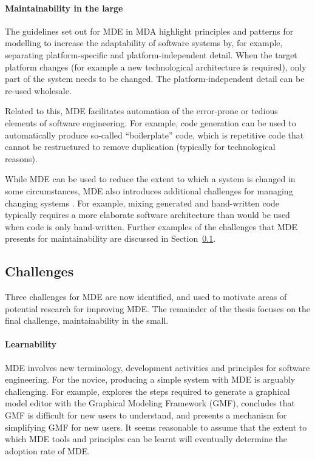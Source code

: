 \paragraph{Maintainability in the large} The guidelines set out for MDE in MDA \cite{mda} highlight principles and patterns for modelling to increase the adaptability of software systems by, for example, separating platform-specific and platform-independent detail. When the target platform changes (for example a new technological architecture is required), only part of the system needs to be changed. The platform-independent detail can be re-used wholesale. 

Related to this, MDE facilitates automation of the error-prone or tedious elements of software engineering. For example, code generation can be used to automatically produce so-called ``boilerplate'' code, which is repetitive code that cannot be restructured to remove duplication (typically for technological reasons).

While MDE can be used to reduce the extent to which a system is changed in some circumstances, MDE also introduces additional challenges for managing changing systems \cite{Mens07}. For example, mixing generated and hand-written code typically requires a more elaborate software architecture than would be used when code is only hand-written. Further examples of the challenges that MDE presents for maintainability are discussed in Section~\ref{subsec:mde_challenges}.


\subsection{Challenges}
\label{subsec:mde_challenges}
Three challenges for MDE are now identified, and used to motivate areas of potential research for improving MDE. The remainder of the thesis focuses on the final challenge, maintainability in the small.

\paragraph{Learnability} MDE involves new terminology, development activities and principles for software engineering. For the novice, producing a simple system with MDE is arguably challenging. For example, \cite{kolovos09eugenia} explores the steps required to generate a graphical model editor with the Graphical Modeling Framework (GMF), concludes that GMF is difficult for new users to understand, and presents a mechanism for simplifying GMF for new users. It seems reasonable to assume that the extent to which MDE tools and principles can be learnt will eventually determine the adoption rate of MDE.

